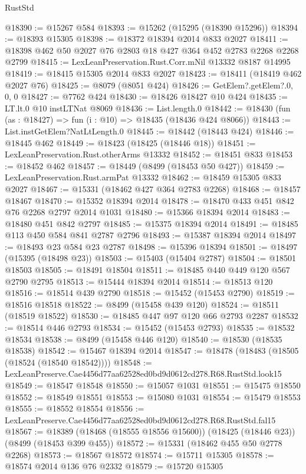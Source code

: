\begin{lexlean}{RustStd}
\begin{coremodule}
@18390 := @15267 @584
@18393 := @15262 (@15295 (@18390 @15296))
@18394 := @18393 @15305
@18398 := @18372 @18394 @2014 @833 @2027
@18411 := @18398 @462 @50 @2027 @76 @2803 @18 @427 @364 @452 @2783 @2268 @2268 @2799
@18415 := LexLeanPreservation.Rust.Corr.mNil @13332 @8187 @14995
@18419 := @18415 @15305 @2014 @833 @2027
@18423 := @18411 (@18419 @462 @2027 @76)
@18425 := @8079 (@8051 @424)
@18426 := GetElem?.getElem?.{0, 0, 0}
@18427 := @7762 @424
@18430 := @18426 @18427 @10 @424
@18435 := LT.lt.{0} @10 instLTNat @8069
@18436 := List.length.{0}
@18442 := @18430 (fun (as : @18427) => fun (i : @10) => @18435 (@18436 @424 @8066))
@18443 := List.instGetElem?NatLtLength.{0}
@18445 := @18442 (@18443 @424)
@18446 := @18445 @462
@18449 := @18423 (@18425 (@18446 @18))
@18451 := LexLeanPreservation.Rust.otherArms @13332
@18452 := @18451 @833
@18453 := @18452 @462
@18457 := @18449 (@8499 (@18453 @50 @427))
@18459 := LexLeanPreservation.Rust.armPat @13332
@18462 := @18459 @15305 @833 @2027
@18467 := @15331 (@18462 @427 @364 @2783 @2268)
@18468 := @18457 @18467
@18470 := @15352 @18394 @2014
@18478 := @18470 @433 @451 @842 @76 @2268 @2797 @2014 @1031
@18480 := @15366 @18394 @2014
@18483 := @18480 @451 @842 @2797
@18485 := @15375 @18394 @2014
@18491 := @18485 @113 @450 @584 @841 @2787 @2796
@18493 := @15387 @18394 @2014
@18497 := @18493 @23 @584 @23 @2787
@18498 := @15396 @18394
@18501 := @18497 (@15395 (@18498 @23))
@18503 := @15403 (@15404 @2787)
@18504 := @18501 @18503
@18505 := @18491 @18504
@18511 := @18485 @440 @449 @120 @567 @2790 @2795
@18513 := @15444 @18394 @2014
@18514 := @18513 @120
@18516 := @18514 @439 @2790
@18518 := @15452 (@15453 @2790)
@18519 := @18516 @18518
@18522 := @8499 (@15458 @439 @120)
@18524 := @18511 (@18519 @18522)
@18530 := @18485 @447 @97 @120 @66 @2793 @2287
@18532 := @18514 @446 @2793
@18534 := @15452 (@15453 @2793)
@18535 := @18532 @18534
@18538 := @8499 (@15458 @446 @120)
@18540 := @18530 (@18535 @18538)
@18542 := @15467 @18394 @2014
@18547 := @18478 (@18483 (@18505 (@18524 (@18540 @18542))))
@18548 := LexLeanPreserve.Cae4456d77aa62528ed0bd9d0612cd278.R68.RustStd.look15
@18549 := @18547 @18548
@18550 := @15057 @1031
@18551 := @15475 @18550
@18552 := @18549 @18551
@18553 := @15080 @1031
@18554 := @15479 @18553
@18555 := @18552 @18554
@18556 := LexLeanPreserve.Cae4456d77aa62528ed0bd9d0612cd278.R68.RustStd.fal15
@18567 := @18389 (@18468 (@18555 @18556 @15600)) (@18425 (@18446 @23)) (@8499 (@18453 @399 @455))
@18572 := @15331 (@18462 @455 @50 @2778 @2268)
@18573 := @18567 @18572
@18574 := @15711 @15305
@18578 := @18574 @2014 @136 @76 @2332
@18579 := @15720 @15305

\end{coremodule}
\end{lexlean}
